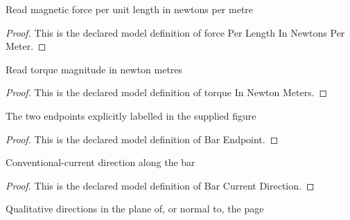 \begin{definition}
  \label{def:physics:phyx-mini-0949:phyxminiproblems-problemphyxmini0949-forceperlengthinnewtonspermeter}
  Read magnetic force per unit length in newtons per metre
\end{definition}
\begin{proof}
  This is the declared model definition of force Per Length In Newtons Per Meter.
\end{proof}
\begin{definition}
  \label{def:physics:phyx-mini-0949:phyxminiproblems-problemphyxmini0949-torqueinnewtonmeters}
  Read torque magnitude in newton metres
\end{definition}
\begin{proof}
  This is the declared model definition of torque In Newton Meters.
\end{proof}
\begin{definition}
  \label{def:physics:phyx-mini-0949:phyxminiproblems-problemphyxmini0949-barendpoint}
  The two endpoints explicitly labelled in the supplied figure
\end{definition}
\begin{proof}
  This is the declared model definition of Bar Endpoint.
\end{proof}
\begin{definition}
  \label{def:physics:phyx-mini-0949:phyxminiproblems-problemphyxmini0949-barcurrentdirection}
  Conventional-current direction along the bar
\end{definition}
\begin{proof}
  This is the declared model definition of Bar Current Direction.
\end{proof}
\begin{definition}
  \label{def:physics:phyx-mini-0949:phyxminiproblems-problemphyxmini0949-pagedirection}
  Qualitative directions in the plane of, or normal to, the page
\end{definition}
